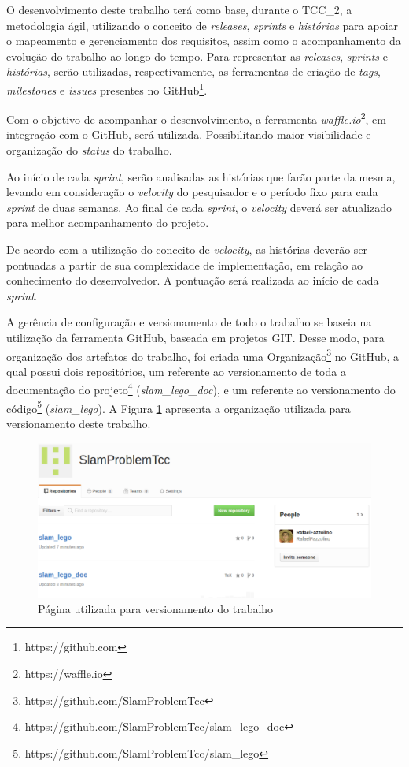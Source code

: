 		O desenvolvimento deste trabalho terá como base, durante o TCC\_2, a metodologia ágil, utilizando o conceito de \textit{releases}, \textit{sprints} e \textit{histórias} para apoiar o mapeamento e gerenciamento dos requisitos, assim como o acompanhamento da evolução do trabalho ao longo do tempo. Para representar as \textit{releases}, \textit{sprints} e \textit{histórias}, serão utilizadas, respectivamente, as ferramentas de criação de \textit{tags}, \textit{milestones} e \textit{issues} presentes no GitHub\footnote{https://github.com}.

		Com o objetivo de acompanhar o desenvolvimento, a ferramenta \textit{waffle.io}\footnote{https://waffle.io}, em integração com o GitHub, será utilizada. Possibilitando maior visibilidade e organização do \textit{status} do trabalho.

		Ao início de cada \textit{sprint}, serão analisadas as histórias que farão parte da mesma, levando em consideração o \textit{velocity} do pesquisador e o período fixo para cada \textit{sprint} de duas semanas. Ao final de cada \textit{sprint}, o \textit{velocity} deverá ser atualizado para melhor acompanhamento do projeto.

		De acordo com a utilização do conceito de \textit{velocity}, as histórias deverão ser pontuadas a partir de sua complexidade de implementação, em relação ao conhecimento do desenvolvedor. A pontuação será realizada ao início de cada \textit{sprint}.

		A gerência de configuração e versionamento de todo o trabalho se baseia na utilização da ferramenta GitHub, baseada em projetos GIT. Desse modo, para organização dos artefatos do trabalho, foi criada uma Organização\footnote{https://github.com/SlamProblemTcc} no GitHub, a qual possui dois repositórios, um referente ao versionamento de toda a documentação do projeto\footnote{https://github.com/SlamProblemTcc/slam\_lego\_doc} (\textit{slam\_lego\_doc}), e um referente ao versionamento do código\footnote{https://github.com/SlamProblemTcc/slam\_lego} (\textit{slam\_lego}). A Figura \ref{img:github} apresenta a organização utilizada para versionamento deste trabalho.

		\begin{figure}[H]
			\centering
			\includegraphics[scale=0.44]{figuras/github.eps}
			\caption[Página utilizada para versionamento do trabalho]{Página utilizada para versionamento do trabalho}
			\label{img:github}
		\end{figure}
	
